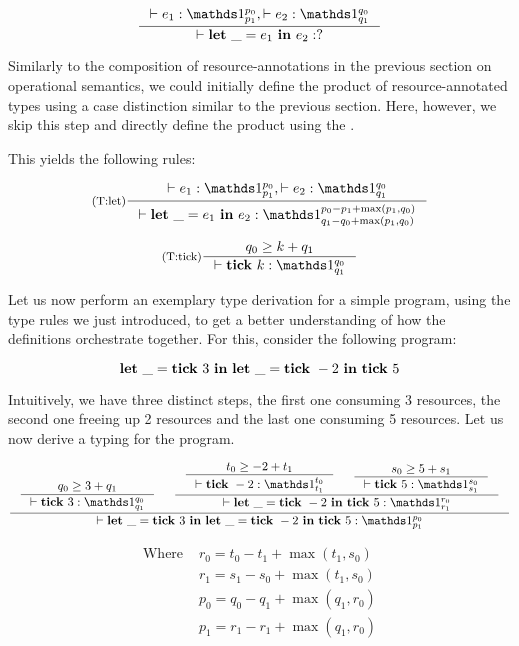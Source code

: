 \[
   \inference[]
   {\typing{}{e_1}{\ratype{\unit}{p_0}{p_1}}, \typing{}{e_2}{\ratype{\unit}{q_0}{q_1}}}
   {\typing{}{\letexp{\_}{e_1}{e_2}}{?}}
\]

Similarly to the composition of resource-annotations in the previous section on operational semantics, we could initially define the product of resource-annotated types using a case distinction similar to the previous section. Here, however, we skip this step and directly define the product using the .

This yields the following rules:

\[
   \label{def:tr-let-4}
   \inference[(T:let)]
   {\typing{}{e_1}{\ratype{\unit}{p_0}{p_1}},  \typing{}{e_2}{\ratype{\unit}{q_0}{q_1}}}
   {\typing{}{\letexp{\_}{e_1}{e_2}}{\ratype{\unit}{p_0 - p_1 + \max(p_1, q_0)}{q_1 - q_0 + \max(p_1, q_0)}}}
\]

\[
   \label{def:tr-tick-4}
   \inference[(T:tick)]
   {q_0 \geq k + q_1}
   {\typing{}{\tick{k}}{\ratype{\unit}{q_0}{q_1}}}
\]


Let us now perform an exemplary type derivation for a simple program, using the type rules we just introduced, to get a better understanding of how the definitions orchestrate together. For this, consider the following program:

\begin{example}

\[
   \mathbf{let}~\_ = \mathbf{tick}~3~\mathbf{in}~\mathbf{let}~\_ = \mathbf{tick}~-2~\mathbf{in}~\mathbf{tick}~5
\]

\end{example}

Intuitively, we have three distinct steps, the first one consuming 3 resources, the second one freeing up 2 resources and the last one consuming 5 resources. Let us now derive a typing for the program.

\[
   \inference
   {
      \inference
      {q_0 \geq 3 + q_1}
      {\typing{}{\tick{3}}{\ratype{\unit}{q_0}{q_1}}}
       &
      \inference
      {
         \inference
         {t_0 \geq -2 + t_1}
         {\typing{}{\tick{-2}}{\ratype{\unit}{t_0}{t_1}}}
          &
         \inference
         {s_0 \geq 5 + s_1}
         {\typing{}{\tick{5}}{\ratype{\unit}{s_0}{s_1}}}
      }
      {\typing{}{\letexp{\_}{\tick{-2}}{\tick{5}}}{\ratype{\unit}{r_0}{r_1}}}
   }
   {\typing{}{\letexp{\_}{\tick{3}}{\letexp{\_}{\tick{-2}}{\tick{5}}}}{\ratype{\unit}{p_0}{p_1}}}
\]

\begin{align*}
   \text{Where }  & r_0 = t_0 - t_1 + \max(t_1, s_0) \\
                  & r_1 = s_1 - s_0 + \max(t_1, s_0) \\
                  & p_0 = q_0 - q_1 + \max(q_1, r_0) \\
                  & p_1 = r_1 - r_1 + \max(q_1, r_0) \\
\end{align*}


